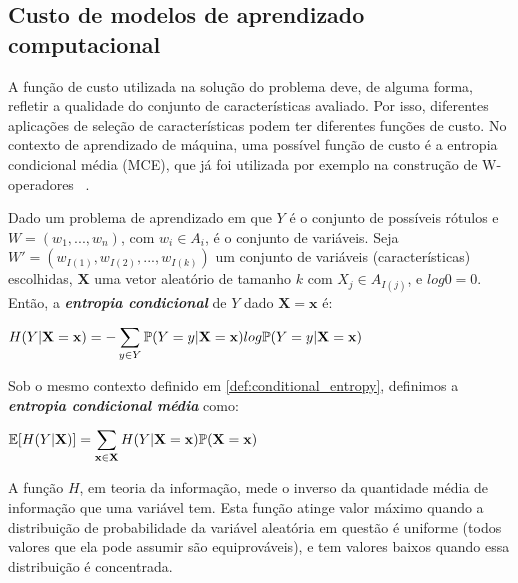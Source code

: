 \subsection{Custo de modelos de aprendizado computacional} 
\label{fund_concept:cost_functions} A função de custo utilizada na 
solução do problema deve, de alguma forma, refletir a qualidade do 
conjunto de características avaliado. Por isso,
diferentes aplicações de seleção de características
podem ter diferentes funções de custo. No contexto de aprendizado de 
máquina, uma possível função de custo é a entropia condicional média
(MCE), que já foi utilizada por exemplo na construção de W-operadores
~\cite{MJCJB06}.

\begin{mydefinition}\label{def:conditional_entropy}
Dado um problema de aprendizado em que $Y$ é o conjunto de possíveis
rótulos e $W = (w_1, ..., w_n)$, com $w_i \in A_i$, é o conjunto de
variáveis. Seja $W' = (w_{I(1)}, w_{I(2)}, ..., w_{I(k)})$ um conjunto 
de variáveis (características) escolhidas, $\mathbf{X}$ uma vetor 
aleatório de tamanho $k$ com ${X_j} \in A_{I(j)}$, e $log0 = 0$. Então,
a {\bf \em entropia condicional} de $Y$ dado $\mathbf{X} = \mathbf x$ é:

\begin{center}
$
\begin{aligned}
H (Y | \mathbf{X = x}) = - 
\sum_{y \in Y} \mathbb{P} (Y = y | \mathbf{X = x}) log \mathbb{P} (Y = y | \mathbf{X = x})
\end{aligned}
$
\end{center}
\end{mydefinition}

\begin{mydefinition}
Sob o mesmo contexto definido em \ref{def:conditional_entropy}, 
definimos a {\bf \em entropia condicional média} como:
\begin{center}
$
\begin{aligned}
    \mathbb{E}[H (Y | \mathbf{X})] = 
    \sum_{\mathbf{x} \in \mathbf{X}} H (Y | \mathbf{X = x}) \mathbb{P} (\mathbf{X = x})
\end{aligned}
$
\end{center}
\end{mydefinition}


A função $H$, em teoria da informação, mede o inverso da quantidade 
média de informação que uma variável tem. Esta função atinge valor 
máximo quando a distribuição de probabilidade da variável aleatória em
questão é uniforme (todos valores que ela pode assumir são 
equiprováveis), e tem valores baixos quando essa distribuição é 
concentrada. 

